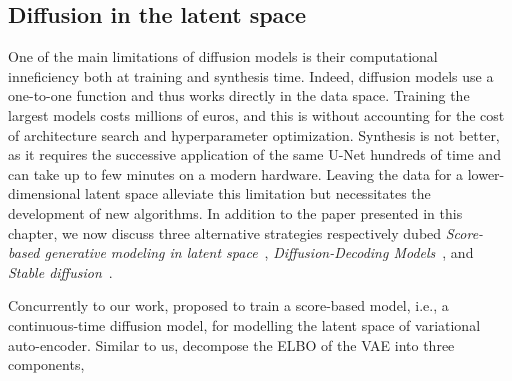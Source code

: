 \subsection{Diffusion in the latent space}
One of the main limitations of diffusion models is their computational inneficiency both at training and synthesis time. Indeed, diffusion models use a one-to-one function and thus works directly in the data space. Training the largest models costs millions of euros, and this is without accounting for the cost of architecture search and hyperparameter optimization. Synthesis is not better, as it requires the successive application of the same U-Net hundreds of time and can take up to few minutes on a modern hardware. Leaving the data for a lower-dimensional latent space alleviate this limitation but necessitates the development of new algorithms. In addition to the paper presented in this chapter, we now discuss three alternative strategies respectively dubed \textit{Score-based generative modeling in latent space}~\citep{vahdat2021score}, \textit{Diffusion-Decoding Models}~\citep{sinha2021d2c}, and \textit{Stable diffusion}~\citep{rombach2022high}.

Concurrently to our work, \citet{vahdat2021score} proposed to train a score-based model, i.e., a continuous-time diffusion model, for modelling the latent space of variational auto-encoder. Similar to us, \citet{vahdat2021score} decompose the ELBO of the VAE into three components,

